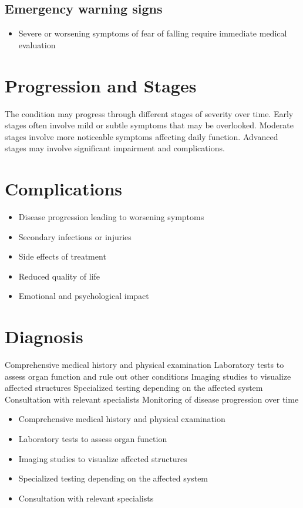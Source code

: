 \subsection{Emergency warning signs}
\begin{itemize}[noitemsep]
  \item Severe or worsening symptoms of fear of falling require immediate medical evaluation
\end{itemize}
\section{Progression and Stages}
The condition may progress through different stages of severity over time. Early stages often involve mild or subtle symptoms that may be overlooked. Moderate stages involve more noticeable symptoms affecting daily function. Advanced stages may involve significant impairment and complications.
\section{Complications}
\begin{itemize}[noitemsep]
  \item Disease progression leading to worsening symptoms
  \item Secondary infections or injuries
  \item Side effects of treatment
  \item Reduced quality of life
  \item Emotional and psychological impact
\end{itemize}
\section{Diagnosis}
Comprehensive medical history and physical examination Laboratory tests to assess organ function and rule out other conditions Imaging studies to visualize affected structures Specialized testing depending on the affected system Consultation with relevant specialists Monitoring of disease progression over time

\begin{itemize}[noitemsep]
  \item Comprehensive medical history and physical examination
  \item Laboratory tests to assess organ function
  \item Imaging studies to visualize affected structures
  \item Specialized testing depending on the affected system
  \item Consultation with relevant specialists
\end{itemize}
